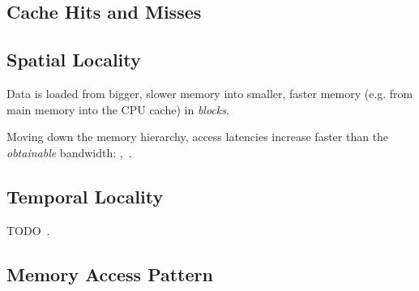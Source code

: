 \subsection{Cache Hits and Misses}

\subsection{Spatial Locality}
Data is loaded from bigger, slower memory into smaller, faster memory (e.g. from main
memory into the CPU cache) in \emph{blocks}.

Moving down the memory hierarchy, access latencies increase faster than the
\emph{obtainable} bandwidth: ,~\cite[2]{afmh}.


\subsection{Temporal Locality}
TODO~\cite{drepper2007}.

\subsection{Memory Access Pattern}
\label{sec:map}

